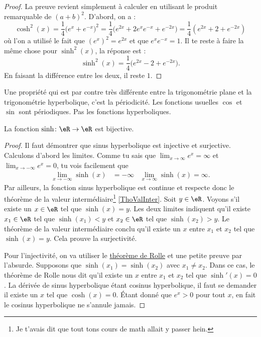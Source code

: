 \begin{proof}
La preuve revient simplement à calculer en utilisant le produit remarquable de $(a+b)^2$. D'abord, on a :
\[ 
  \cosh^2(x)=\frac{1}{ 4 }\big(  e^{x}+ e^{-x} \big)^2=\frac{1}{ 4 }\big(  e^{2x}+2 e^{x} e^{-x}+ e^{-2x} \big)=\frac{1}{ 4 }( e^{2x}+2+ e^{-2x})
\]
où l'on a utilisé le fait que $(e^{x})^2= e^{2x}$ et que $ e^{x} e^{-x}=1$. Il te reste à faire la même chose pour $\sinh^2(x)$, la réponse est :
\[ 
  \sinh^2(x)=\frac{1}{ 4 }\big(  e^{2x}-2+ e^{-2x} \big).
\]
En faisant la différence entre les deux, il reste $1$.
\end{proof}
Une propriété qui est par contre très différente entre la trigonométrie plane et la trigonométrie hyperbolique, c'est la périodicité. Les fonctions usuelles $\cos$ et $\sin$ sont périodiques. Pas les fonctions hyperboliques.

\begin{proposition}
La fonction $\sinh\colon \eR\to\eR $ est bijective.
\end{proposition}

\begin{proof}
Il faut démontrer que sinus hyperbolique est injective et surjective. Calculons d'abord les limites. Comme tu sais que $\lim_{x\to\infty} e^{x}=\infty$ et $\lim_{x\to-\infty} e^{x}=0$, tu vois facilement que
\begin{align}
\lim_{x\to-\infty}\sinh(x)&=-\infty	&\lim_{x\to\infty}\sinh(x)=\infty.
\end{align}
Par ailleurs, la fonction sinus hyperbolique est continue et respecte donc le théorème de la valeur intermédiaire\footnote{Je t'avais dit que tout tons cours de math allait y passer hein.} \ref{ThoValInter}. Soit $y\in\eR$. Voyons s'il existe un $x\in\eR$ tel que $\sinh(x)=y$. Les deux limites indiquent qu'il existe $x_1\in\eR$ tel que $\sinh(x_1)<y$ et $x_2\in\eR$ tel que $\sinh(x_2)>y$. Le théorème de la valeur intermédiaire conclu qu'il existe un $x$ entre $x_1$ et $x_2$ tel que $\sinh(x)=y$. Cela prouve la surjectivité.

Pour l'injectivité, on va utiliser le \href{http://fr.wikipedia.org/wiki/Théorème_de_Rolle}{théorème de Rolle} et une petite preuve par l'absurde. Supposons que $\sinh(x_1)=\sinh(x_2)$ avec $x_1\neq x_2$. Dans ce cas, le théorème de Rolle nous dit qu'il existe un $x$ entre $x_1$ et $x_2$ tel que $\sinh'(x)=0$. La dérivée de sinus hyperbolique étant cosinus hyperbolique, il faut se demander il existe un $x$ tel que $\cosh(x)=0$. Étant donné que $ e^{x}>0$ pour tout $x$, en fait le cosinus hyperbolique ne s'annule jamais.
\end{proof}

